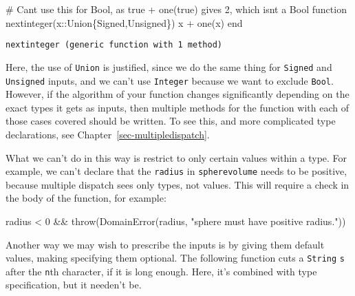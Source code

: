 \documentclass[
  letterpaper,
  DIV=11,
  numbers=noendperiod]{scrreprt}
\newenvironment{Shaded}{\begin{snugshade}}{\end{snugshade}}
\newcommand{\CommentTok}[1]{\textcolor[rgb]{0.37,0.37,0.37}{#1}}
\newcommand{\DataTypeTok}[1]{\textcolor[rgb]{0.68,0.00,0.00}{#1}}
\newcommand{\FloatTok}[1]{\textcolor[rgb]{0.68,0.00,0.00}{#1}}
\newcommand{\FunctionTok}[1]{\textcolor[rgb]{0.28,0.35,0.67}{#1}}
\newcommand{\KeywordTok}[1]{\textcolor[rgb]{0.00,0.23,0.31}{#1}}
\newcommand{\NormalTok}[1]{\textcolor[rgb]{0.00,0.23,0.31}{#1}}
\newcommand{\OperatorTok}[1]{\textcolor[rgb]{0.37,0.37,0.37}{#1}}
\newcommand{\StringTok}[1]{\textcolor[rgb]{0.13,0.47,0.30}{#1}}
\begin{document}
\begin{Shaded}
\begin{Highlighting}[]
\CommentTok{\# Can\textquotesingle{}t use this for \textasciigrave{}Bool\textasciigrave{}, as \textasciigrave{}true + one(true)\textasciigrave{} gives \textasciigrave{}2\textasciigrave{}, which isn\textquotesingle{}t a \textasciigrave{}Bool\textasciigrave{}}
\KeywordTok{function} \FunctionTok{nextinteger}\NormalTok{(x}\OperatorTok{::}\DataTypeTok{Union\{Signed,Unsigned\}}\NormalTok{)}
\NormalTok{    x }\OperatorTok{+} \FunctionTok{one}\NormalTok{(x)}
\KeywordTok{end}
\end{Highlighting}
\end{Shaded}

\begin{verbatim}
nextinteger (generic function with 1 method)
\end{verbatim}

Here, the use of \texttt{Union} is justified, since we do the same thing
for \texttt{Signed} and \texttt{Unsigned} inputs, and we can't use
\texttt{Integer} because we want to exclude \texttt{Bool}. However, if
the algorithm of your function changes significantly depending on the
exact types it gets as inputs, then multiple methods for the function
with each of those cases covered should be written. To see this, and
more complicated type declarations, see
Chapter~\ref{sec-multipledispatch}.

What we can't do in this way is restrict to only certain values within a
type. For example, we can't declare that the \texttt{radius} in
\texttt{spherevolume} needs to be positive, because multiple dispatch
sees only types, not values. This will require a check in the body of
the function, for example:

\begin{Shaded}
\begin{Highlighting}[]
\NormalTok{radius }\OperatorTok{\textless{}} \FloatTok{0} \OperatorTok{\&\&} \FunctionTok{throw}\NormalTok{(}\FunctionTok{DomainError}\NormalTok{(radius, }\StringTok{"sphere must have positive radius."}\NormalTok{))}
\end{Highlighting}
\end{Shaded}

Another way we may wish to prescribe the inputs is by giving them
default values, making specifying them optional. The following function
cuts a \texttt{String} \texttt{s} after the \texttt{n}th character, if
it is long enough. Here, it's combined with type specification, but it
needen't be.
\end{document}
